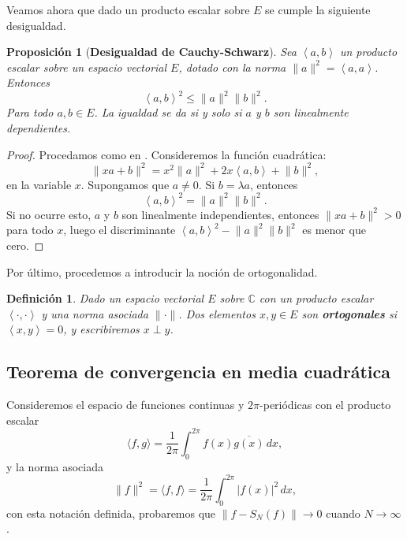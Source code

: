 \documentclass[12pt]{article}
\newcommand{\C}{\mathbb{C}}
\theoremstyle{plain}
\newtheorem{proposicion}[teorema]{Proposición}
\newtheorem{definicion}[teorema]{\textbf{Definición}}
\theoremstyle{definition}
\numberwithin{equation}{section}
\begin{document}
            Veamos ahora que dado un producto escalar sobre \(E\) se cumple la siguiente desigualdad.
            \begin{proposicion}[\textbf{Desigualdad de Cauchy-Schwarz}]
                \label{CS}
                Sea \( \left\langle a, b\right\rangle  \) un producto escalar sobre un espacio vectorial \(E\), dotado con la norma \(\lVert a \rVert^2 = \left\langle a, a \right\rangle\). Entonces
            $$\left\langle a, b\right\rangle^2 \leq \lVert a \rVert^2 \lVert b \rVert^2.$$ Para todo \(a,b \in E\). La igualdad se da si y solo si \(a\) y \(b\) son linealmente dependientes. 
            \end{proposicion}
            \begin{proof}
                Procedamos como en \cite[Chapter 18, Theorem 1]{god}. Consideremos la función cuadrática: $$\lVert xa + b \rVert^2 = x^2 \lVert a \rVert^2 + 2x \left\langle a, b\right\rangle + \lVert b \rVert^2,$$ en la variable \(x\). Supongamos que \(a \neq 0\). Si \(b = \lambda a\), entonces $$\left\langle a, b\right\rangle^2 = \lVert a \rVert^2 \lVert b \rVert^2.$$ Si no ocurre esto, \(a\) y \(b\) son linealmente independientes, entonces \(\lVert xa + b \rVert^2 > 0\) para todo \(x\), luego el discriminante \(\left\langle a, b\right\rangle^2 - \lVert a \rVert^2 \lVert b \rVert^2\) es menor que cero.
            \end{proof}
            Por último, procedemos a introducir la noción de ortogonalidad.
            \begin{definicion}
                Dado un espacio vectorial \(E\) sobre \( \C\) con un producto escalar \(\left\langle\cdot, \cdot\right\rangle\) y una norma asociada \(\lVert \cdot \rVert\). Dos elementos \(x,y \in E\) son \textbf{ortogonales} si \(\left\langle x , y\right\rangle = 0\), y escribiremos \(x \perp y\).
            \end{definicion}
        \subsection{Teorema de convergencia en media cuadrática}
            Consideremos el espacio de funciones continuas y \(2\pi\)-periódicas con el producto escalar
            \begin{equation*}
                \langle f,g \rangle = \frac{1}{2\pi} \int_{0}^{2\pi} f(x)\overline{g(x)}  \,dx,
            \end{equation*}
            y la norma asociada
            \begin{equation}
                \label{norma}
                \lVert f \rVert^2 = \langle f,f \rangle = \frac{1}{2\pi} \int_{0}^{2\pi} \left\lvert f(x)\right\rvert^2   \,dx,
            \end{equation}
            con esta notación definida, probaremos que \(\lVert f - S_N (f)\rVert \to 0\) cuando \(N \to \infty\).
\end{document}

